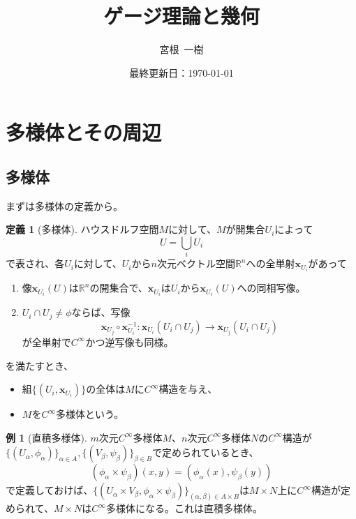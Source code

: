 \documentclass[unicode,a4paper,11pt]{ltjsarticle}
\title{
  ゲージ理論と幾何
}
\author{
  宮根\ 一樹
}
\date{最終更新日：\today}
\theoremstyle{definition}
\newtheorem{dfn}{定義}[section]
\newtheorem{exm}{例}[section]
\begin{document}
\maketitle
\tableofcontents

\clearpage
\section{多様体とその周辺}

\subsection{多様体}

まずは多様体の定義から。

\begin{dfn}[多様体]
  ハウスドルフ空間$M$に対して、$M$が開集合$U_{i}$によって
  \begin{equation}
    U
    =
    \bigcup_{i}U_{i}
  \end{equation}
  で表され、各$U_{i}$に対して、$U_{i}$から$n$次元ベクトル空間$\mathbb{R}^{n}$への全単射$\bm{x}_{U_{i}}$があって
  \begin{enumerate}
    \item
          像$\bm{x}_{U_{i}}(U)$は$\mathbb{R}^{n}$の開集合で、$\bm{x}_{U_{i}}$は$U_{i}$から$\bm{x}_{U_{i}}(U)$への同相写像。
    \item
          $U_{i}\cap U_{j}\neq\phi$ならば、写像
          \begin{equation}
            \bm{x}_{U_{j}}\circ\bm{x}_{U_{i}}^{-1}
            :
            \bm{x}_{U_{i}}(U_{i}\cap U_{j})\rightarrow\bm{x}_{U_{j}}(U_{i}\cap U_{j})
          \end{equation}
          が全単射で$C^{\infty}$かつ逆写像も同様。
  \end{enumerate}
  を満たすとき、
  \begin{itemize}
    \item
          組$\{(U_{i},\bm{x}_{U_{i}})\}$の全体は$M$に$C^{\infty}$構造を与え、
    \item
          $M$を$C^{\infty}$多様体という。
  \end{itemize}
\end{dfn}

\begin{exm}[直積多様体]
  $m$次元$C^{\infty}$多様体$M$、$n$次元$C^{\infty}$多様体$N$の$C^{\infty}$構造が$\{(U_{\alpha},\phi_{\alpha})\}_{\alpha\in A},\{(V_{\beta},\psi_{\beta})\}_{\beta\in B}$で定められているとき、
  \begin{equation}
    (\phi_{\alpha}\times\psi_{\beta})(x,y)
    =
    (\phi_{\alpha}(x),\psi_{\beta}(y))
  \end{equation}
  で定義しておけば、$\{(U_{\alpha}\times V_{\beta},\phi_{\alpha}\times\psi_{\beta})\}_{(\alpha,\beta)\in A\times B}$は$M\times N$上に$C^{\infty}$構造が定められて、$M\times N$は$C^{\infty}$多様体になる。これは直積多様体。
\end{exm}
\end{document}
